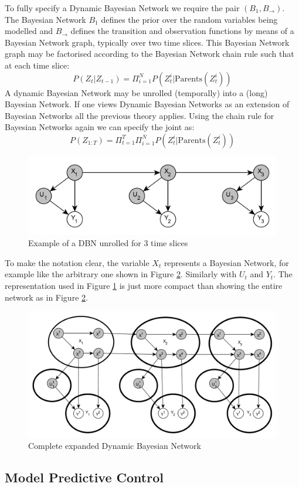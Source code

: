 \documentclass[../masters.tex]{subfiles}
\begin{document}
To fully specify a Dynamic Bayesian Network we require the pair $(B_1, B_{\rightarrow})$. The Bayesian Network $B_1$ defines the prior over the random variables being modelled and $B_{\rightarrow}$ defines the transition and observation functions by means of a Bayesian Network graph, typically over two time slices. This Bayesian Network graph may be factorised according to the Bayesian Network chain rule such that at each time slice:
\begin{equation}
P(Z_t|Z_{t-1}) = \Pi_{i=1}^{N}P(Z_t^i| \text{Parents} (Z^i_t))
\end{equation}
A dynamic Bayesian Network may be unrolled (temporally) into a (long) Bayesian Network. If one views Dynamic Bayesian Networks as an extension of Bayesian Networks all the previous theory applies. Using the chain rule for Bayesian Networks again we can specify the joint as:
\begin{equation}
P(Z_{1:T}) = \Pi_{t=1}^{T}\Pi_{i=1}^{N}P(Z_t^i| \text{Parents} (Z^i_t))
\end{equation}
\begin{figure}[H] 
\centering
\includegraphics[scale=0.8]{general_dbn.pdf}
\caption{Example of a DBN unrolled for 3 time slices}
\label{fig_gen_dbn}
\end{figure}
To make the notation clear, the variable $X_t$ represents a Bayesian Network, for example like the arbitrary one shown in Figure \ref{fig_spec_dbn}. Similarly with $U_t$ and $Y_t$. The representation used in Figure \ref{fig_gen_dbn} is just more compact than showing the entire network as in Figure \ref{fig_spec_dbn}.
\begin{figure}[H] 
\centering
\includegraphics[scale=0.4]{spec_dbn.pdf}
\caption{Complete expanded Dynamic Bayesian Network}
\label{fig_spec_dbn}
\end{figure}

\subsection{Model Predictive Control}



\end{document}

